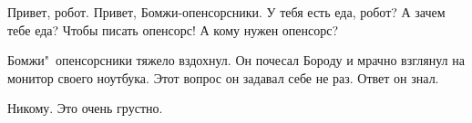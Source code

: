 \begin{dialog}
\X Привет, робот.
\R Привет, Бомжи-опенсорсники.
\X У тебя есть еда, робот?
\R А зачем тебе еда?
\X Чтобы писать опенсорс!
\R А кому нужен опенсорс?
\end{dialog}

\begin{monolog}
Бомжи"~опенсорсники тяжело вздохнул. Он почесал Бороду и мрачно взглянул на монитор своего ноутбука. Этот вопрос он задавал себе не раз. Ответ он знал.
\end{monolog}

\begin{dialog}
\X Никому.
\R Это очень грустно.
\end{dialog}